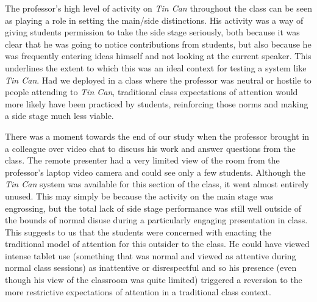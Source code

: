 The professor's high level of activity on \emph{Tin Can} throughout the class can be seen as playing a role in setting the main/side distinctions. His activity was a way of giving students permission to take the side stage seriously, both because it was clear that he was going to notice contributions from students, but also because he was frequently entering ideas himself and not looking at the current speaker. This underlines the extent to which this was an ideal context for testing a system like \emph{Tin Can}. Had we deployed in a class where the professor was neutral or hostile to people attending to \emph{Tin Can}, traditional class expectations of attention would more likely have been practiced by students, reinforcing those norms and making a side stage much less viable.






There was a moment towards the end of our study when the professor brought in a colleague over video chat to discuss his work and answer questions from the class. The remote presenter had a very limited view of the room from the professor's laptop video camera and could see only a few students. Although the \emph{Tin Can} system was available for this section of the class, it went almost entirely unused. This may simply be because the activity on the main stage was engrossing, but the total lack of side stage performance was still well outside of the bounds of normal disuse during a particularly engaging presentation in class. This suggests to us that the students were concerned with enacting the traditional model of attention for this outsider to the class. He could have viewed intense tablet use (something that was normal and viewed as attentive during normal class sessions) as inattentive or disrespectful and so his presence (even though his view of the classroom was quite limited) triggered a reversion to the more restrictive expectations of attention in a traditional class context.

